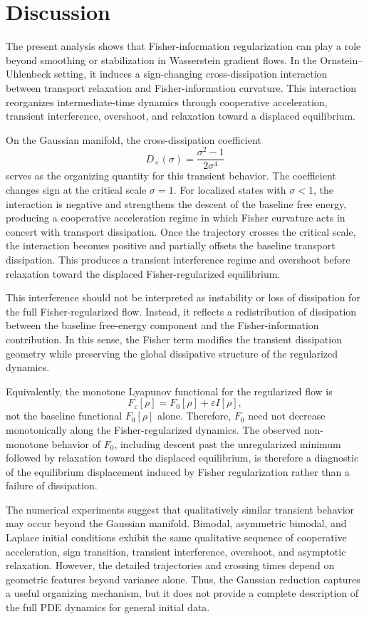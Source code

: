 \documentclass[aps,prl,twocolumn,10pt,superscriptaddress]{revtex4-2}
\begin{document}
\section{Discussion}
\label{sec:discussion}

The present analysis shows that Fisher-information regularization can play a role beyond smoothing or stabilization in Wasserstein gradient flows. In the Ornstein--Uhlenbeck setting, it induces a sign-changing cross-dissipation interaction between transport relaxation and Fisher-information curvature. This interaction reorganizes intermediate-time dynamics through cooperative acceleration, transient interference, overshoot, and relaxation toward a displaced equilibrium.

On the Gaussian manifold, the cross-dissipation coefficient
\[
D_\times(\sigma)
=
\frac{\sigma^2-1}{2\sigma^4}
\]
serves as the organizing quantity for this transient behavior. The coefficient changes sign at the critical scale $\sigma=1$. For localized states with $\sigma<1$, the interaction is negative and strengthens the descent of the baseline free energy, producing a cooperative acceleration regime in which Fisher curvature acts in concert with transport dissipation. Once the trajectory crosses the critical scale, the interaction becomes positive and partially offsets the baseline transport dissipation. This produces a transient interference regime and overshoot before relaxation toward the displaced Fisher-regularized equilibrium.

This interference should not be interpreted as instability or loss of dissipation for the full Fisher-regularized flow. Instead, it reflects a redistribution of dissipation between the baseline free-energy component and the Fisher-information contribution. In this sense, the Fisher term modifies the transient dissipation geometry while preserving the global dissipative structure of the regularized dynamics.

Equivalently, the monotone Lyapunov functional for the regularized flow is
\[
F_\varepsilon[\rho]
=
F_0[\rho]
+
\varepsilon I[\rho],
\]
not the baseline functional $F_0[\rho]$ alone. Therefore, $F_0$ need not decrease monotonically along the Fisher-regularized dynamics. The observed non-monotone behavior of $F_0$, including descent past the unregularized minimum followed by relaxation toward the displaced equilibrium, is therefore a diagnostic of the equilibrium displacement induced by Fisher regularization rather than a failure of dissipation.

The numerical experiments suggest that qualitatively similar transient behavior may occur beyond the Gaussian manifold. Bimodal, asymmetric bimodal, and Laplace initial conditions exhibit the same qualitative sequence of cooperative acceleration, sign transition, transient interference, overshoot, and asymptotic relaxation. However, the detailed trajectories and crossing times depend on geometric features beyond variance alone. Thus, the Gaussian reduction captures a useful organizing mechanism, but it does not provide a complete description of the full PDE dynamics for general initial data.
\end{document}
